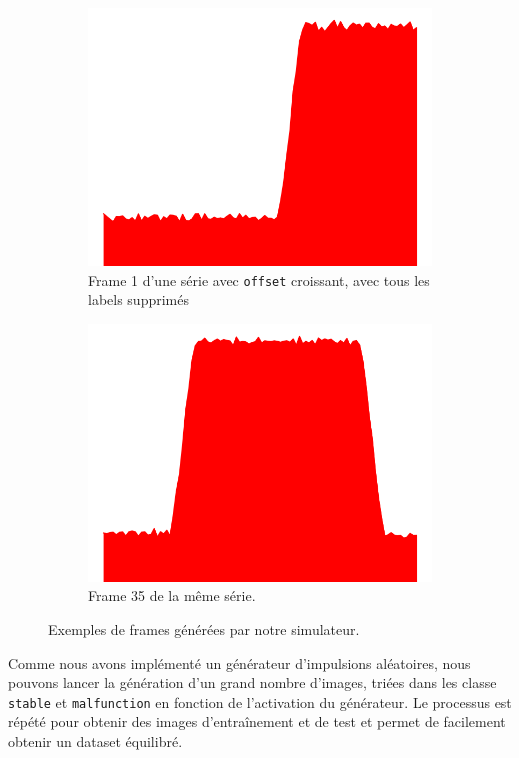 \documentclass[french]{article}
\theoremstyle{mytheoremstyle}
\theoremstyle{mytheoremstyle}
\theoremstyle{myproblemstyle}
\begin{document}
        \begin{figure}[H]
    \centering
    \begin{subfigure}[t]{0.45\textwidth}
            \centering
            \includegraphics[width=.75\linewidth]{images/frame1.png}
            \caption{Frame 1 d'une série avec \texttt{offset} croissant, avec tous les labels supprimés}
    \end{subfigure}
    \begin{subfigure}[t]{0.45\textwidth}
            \centering
           \includegraphics[width=.75\linewidth]{images/frame35.png}
            \caption{Frame 35 de la même série.}
    \end{subfigure}
    \caption{Exemples de frames générées par notre simulateur.}
\end{figure}

        
        Comme nous avons implémenté un générateur d'impulsions aléatoires, nous pouvons lancer la génération d'un grand nombre d'images, triées dans les classe \texttt{stable} et \texttt{malfunction} en fonction de l'activation du générateur. Le processus est répété pour obtenir des images d'entraînement et de test et permet de facilement obtenir un dataset équilibré.
        
\end{document}
